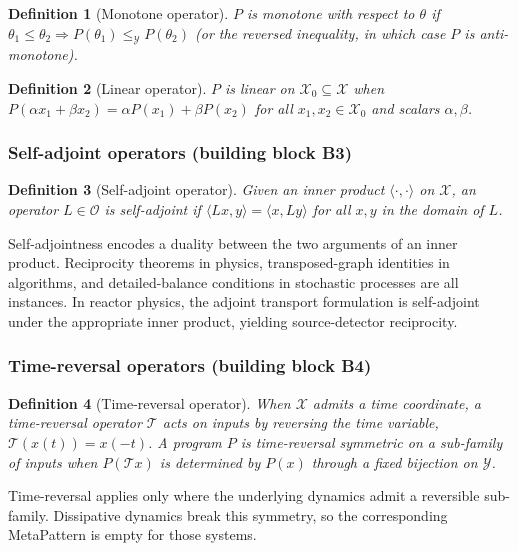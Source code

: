 \documentclass[manuscript]{acmart}
\newtheorem{definition}{Definition}
\begin{document}
\begin{definition}[Monotone operator]
$P$ is \emph{monotone with respect to} $\theta$ if $\theta_1 \le \theta_2 \Rightarrow P(\theta_1) \le_{\mathcal{Y}} P(\theta_2)$ (or the reversed inequality, in which case $P$ is \emph{anti-monotone}).
\end{definition}

\begin{definition}[Linear operator]
$P$ is \emph{linear} on $\mathcal{X}_0 \subseteq \mathcal{X}$ when $P(\alpha x_1 + \beta x_2) = \alpha P(x_1) + \beta P(x_2)$ for all $x_1, x_2 \in \mathcal{X}_0$ and scalars $\alpha, \beta$.
\end{definition}

\subsubsection{Self-adjoint operators (building block B3)}

\begin{definition}[Self-adjoint operator]
Given an inner product $\langle\cdot,\cdot\rangle$ on $\mathcal{X}$, an operator $L \in \mathcal{O}$ is \emph{self-adjoint} if $\langle Lx, y\rangle = \langle x, Ly\rangle$ for all $x, y$ in the domain of $L$.
\end{definition}

Self-adjointness encodes a duality between the two arguments of an inner product. Reciprocity theorems in physics, transposed-graph identities in algorithms, and detailed-balance conditions in stochastic processes are all instances. In reactor physics, the adjoint transport formulation is self-adjoint under the appropriate inner product, yielding source-detector reciprocity.

\subsubsection{Time-reversal operators (building block B4)}

\begin{definition}[Time-reversal operator]
When $\mathcal{X}$ admits a time coordinate, a \emph{time-reversal operator} $\mathcal{T}$ acts on inputs by reversing the time variable, $\mathcal{T}(x(t)) = x(-t)$. A program $P$ is \emph{time-reversal symmetric} on a sub-family of inputs when $P(\mathcal{T} x)$ is determined by $P(x)$ through a fixed bijection on $\mathcal{Y}$.
\end{definition}

Time-reversal applies only where the underlying dynamics admit a reversible sub-family. Dissipative dynamics break this symmetry, so the corresponding MetaPattern is empty for those systems.
\end{document}
